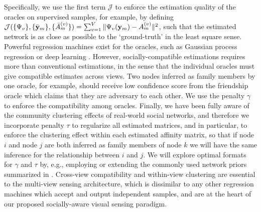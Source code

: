Specifically, we use the first term $\mathcal{J}$ to enforce the estimation quality of the oracles on supervised samples, for example, by defining $\mathcal{J}(\{\Psi_{v}\}, \{\bar{{\bf y}}_m\}, \{\bar{A}^{(v)}_m\})=\sum_{v=1}^{V}\|\Psi_{v}({\bf y}_m)-A^{(v)}_m\|^{2}$,  such that the estimated network is as close as possible to the `ground-truth' in the least square sense. Powerful regression machines exist for the oracles, such as Gaussian process regression \cite{GPbook} or deep learning \cite{DLbook}. However, socially-compatible estimations requires more than conventional estimations, in the sense that the individual oracles must give compatible estimates across views. Two nodes inferred as family members by one oracle, for example, should receive low confidence score from the friendship oracle which claims that they are adversary to each other. We use the penalty $\gamma$ to enforce the compatibility among oracles. Finally, we have been fully aware of the community clustering effects of real-world social networks, and therefore we incorporate penalty $\tau$ to regularize all estimated matrices, and in particular, to enforce the clustering effect within each estimated affinity matrix, so that if node $i$ and node $j$ are both inferred as family members of node $k$ we will have the same inference for the relationship between $i$ and $j$. We will explore optimal formats for $\gamma$ and $\tau$ by, e.g., employing or extending the commonly used network priors summarized in \cite{Goldenberg}. Cross-view compatibility and within-view clustering are essential to the multi-view sensing architecture, which is dissimilar to any other regression machines which accept and output independent samples, and are at the heart of our proposed socially-aware visual sensing paradigm.







